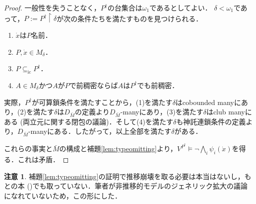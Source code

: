 \documentclass[uplatex]{jsarticle}
\newcommand{\restrict}{\upharpoonright}
\newcommand{\subsetic}{\subseteq_{\mathrm{ic}}}
\theoremstyle{definition}
\newtheorem{rmk}[thm]{注意}
\begin{document}
\begin{proof}
		一般性を失うことなく，$P^\dagger$の台集合は$\omega_1$であるとしてよい．
		$\delta < \omega_1$であって，$P := P^\dagger \restrict \delta$が次の条件たちを満たすものを見つけられる．
		
		\begin{enumerate}
			\item $\dot{x}$は$P$名前．
			\item $P, \dot{x} \in M_\delta$．
			\item $P \subsetic P^\dagger$．
			\item $A \in M_\delta$かつ$A$が$P$で前稠密ならば$A$は$P^\dagger$でも前稠密．
		\end{enumerate}
		
		実際，$P^\dagger$が可算鎖条件を満たすことから，(1)を満たす$\delta$はcobounded manyにあり，(2)を満たす$\delta$は$D_{\bar{M}}$の定義より$D_{\bar{M}}$-manyにあり，(3)を満たす$\delta$はclub manyにある (両立元に関する閉包の議論)．そして(4)を満たす$\delta$も神託連鎖条件の定義より，$D_{\bar{M}}$-manyにある．したがって，以上全部を満たす$\delta$がある．
		
		これらの事実と$\bar{M}$の構成と補題\ref{lem:typeomitting}より，$V^{P^\dagger} \models \neg \bigwedge_i \psi_i(\dot{x})$を得る．これは矛盾．
	\end{proof}

	\begin{rmk}
		補題\ref{lem:typeomitting}の証明で推移崩壊を取る必要は本当はないし，もとの本 (\cite{shelah2017proper})でも取っていない．筆者が非推移的モデルのジェネリック拡大の議論になれていないため，この形にした．
	\end{rmk}

	
	
	\nocite{*}
	\printbibliography[title={参考文献}]
	
\end{document}
